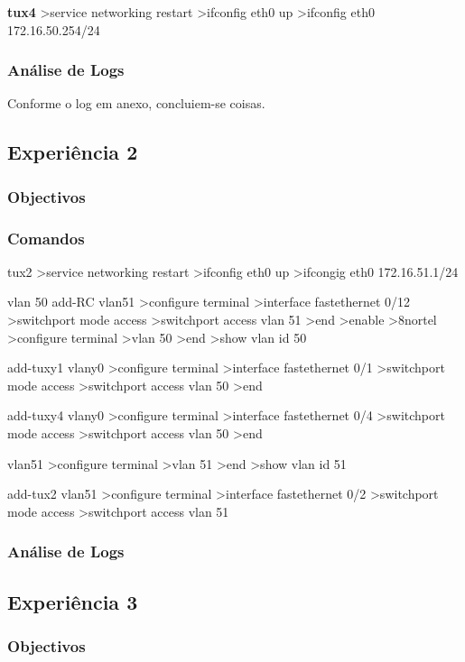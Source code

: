 \documentclass[a4paper,11pt]{article}
\begin{document}
\textbf{tux4}
>service networking restart
>ifconfig eth0 up
>ifconfig eth0 172.16.50.254/24

\subsubsection{Análise de Logs}
Conforme o log em anexo, concluiem-se coisas.

\subsection{Experiência 2}
\subsubsection{Objectivos}

\subsubsection{Comandos}
tux2
>service networking restart
>ifconfig eth0 up
>ifcongig eth0 172.16.51.1/24

vlan 50
add-RC vlan51
>configure terminal
>interface fastethernet 0/12
>switchport mode access
>switchport access vlan 51
>end
>enable
>8nortel
>configure terminal
>vlan 50
>end
>show vlan id 50

add-tuxy1 vlany0
>configure terminal
>interface fastethernet 0/1
>switchport mode access
>switchport access vlan 50
>end

add-tuxy4 vlany0
>configure terminal
>interface fastethernet 0/4
>switchport mode access
>switchport access vlan 50
>end


vlan51
>configure terminal
>vlan 51
>end
>show vlan id 51

add-tux2 vlan51
>configure terminal
>interface fastethernet 0/2
>switchport mode access
>switchport access vlan 51

\subsubsection{Análise de Logs}

\subsection{Experiência 3}
\subsubsection{Objectivos}
\end{document}
